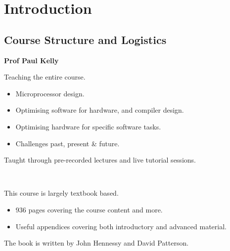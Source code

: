 \chapter{Introduction}
\section{Course Structure and Logistics}
\begin{minipage}{.3\textwidth}
	\begin{center}
		\centerline{\textbf{Prof Paul Kelly}}
	\end{center}
\end{minipage}
\hfill
\begin{minipage}{.68\textwidth}
	Teaching the entire course.
	\begin{itemize}
		\item Microprocessor design.
		\item Optimising software for hardware, and compiler design.
		\item Optimising hardware for specific software tasks.
		\item Challenges past, present \& future.
	\end{itemize}
	Taught through pre-recorded lectures and live tutorial sessions.
\end{minipage}
\\ \begin{minipage}{.63\textwidth}
	This course is largely textbook based.
	\begin{itemize}
		\item $936$ pages covering the course content and more.
		\item Useful appendices covering both introductory and advanced material.
	\end{itemize}
	The book is written by John Hennessy and David Patterson.
\end{minipage}
